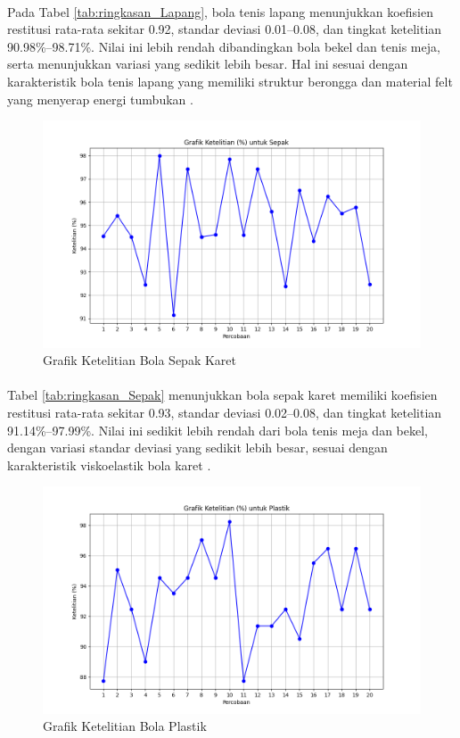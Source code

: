 

\paragraph{}Pada Tabel \ref{tab:ringkasan_Lapang}, bola tenis lapang menunjukkan koefisien restitusi rata-rata sekitar 0.92, standar deviasi 0.01--0.08, dan tingkat ketelitian 90.98\%--98.71\%. Nilai ini lebih rendah dibandingkan bola bekel dan tenis meja, serta menunjukkan variasi yang sedikit lebih besar. Hal ini sesuai dengan karakteristik bola tenis lapang yang memiliki struktur berongga dan material felt yang menyerap energi tumbukan \citep{penner2002physics, cross2002coefficient}.

\begin{figure}[!htbp]
    \centering
    \includegraphics[width=0.5\linewidth]{output_tex/Grafik_ketelitian_Sepak.png}
    \caption{Grafik Ketelitian Bola Sepak Karet}
    \label{fig:grafik-bola-karet}
\end{figure}



\paragraph{}Tabel \ref{tab:ringkasan_Sepak} menunjukkan bola sepak karet memiliki koefisien restitusi rata-rata sekitar 0.93, standar deviasi 0.02--0.08, dan tingkat ketelitian 91.14\%--97.99\%. Nilai ini sedikit lebih rendah dari bola tenis meja dan bekel, dengan variasi standar deviasi yang sedikit lebih besar, sesuai dengan karakteristik viskoelastik bola karet \citep{brancazio1981physics}.

\begin{figure}[!htbp]
    \centering
    \includegraphics[width=0.5\linewidth]{output_tex/Grafik_ketelitian_Plastik.png}
    \caption{Grafik Ketelitian Bola Plastik}
    \label{fig:grafik-bola-plastik}
\end{figure}

